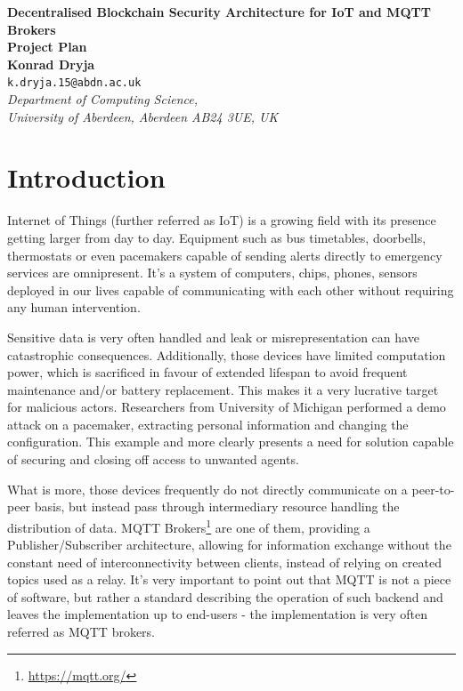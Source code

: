 \documentclass[a4paper,12pt]{article}
\begin{document}
\begin{center}
{\Large\bf{Decentralised Blockchain Security Architecture for IoT and MQTT Brokers}} \\
      \vspace{5.0mm}
{\Large\bf{Project Plan}} \\
      \vspace{8mm}
      {\large\bf{Konrad Dryja}}  \\
      \vspace{5.0mm}
       {\tt k.dryja.15@abdn.ac.uk} \\
      \vspace{5.0mm}
      {\em Department of Computing Science,\\
       University of Aberdeen, Aberdeen AB24 3UE, UK} 
\end{center}


\section*{Introduction}

Internet of Things (further referred as IoT) is a growing field with its presence getting larger from day to day. Equipment such as bus timetables, doorbells, thermostats or even pacemakers capable of sending alerts directly to emergency services are omnipresent. It's a system of computers, chips, phones, sensors deployed in our lives capable of communicating with each other without requiring any human intervention.

Sensitive data is very often handled and leak or misrepresentation can have catastrophic consequences. Additionally, those devices have limited computation power, which is sacrificed in favour of extended lifespan to avoid frequent maintenance and/or battery replacement. This makes it a very lucrative target for malicious actors. Researchers from University of Michigan performed a demo attack on a pacemaker, extracting personal information and changing the configuration.\cite{4531149} This example and more clearly presents a need for solution capable of securing and closing off access to unwanted agents.

What is more, those devices frequently do not directly communicate on a peer-to-peer basis, but instead pass through intermediary resource handling the distribution of data. MQTT Brokers\footnote{\url{https://mqtt.org/}} are one of them, providing a Publisher/Subscriber architecture, allowing for information exchange without the constant need of interconnectivity between clients, instead of relying on created topics used as a relay. It's very important to point out that MQTT is not a piece of software, but rather a standard describing the operation of such backend and leaves the implementation up to end-users - the implementation is very often referred as MQTT brokers.
\end{document}
